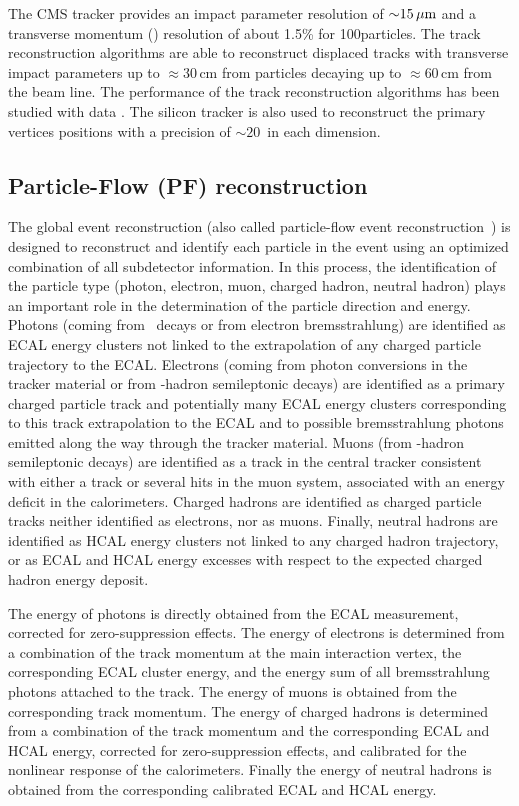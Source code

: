 The CMS tracker provides an impact parameter resolution of ${\sim}15\,\mu\text{m}$ and a transverse momentum (\pt) resolution of about 1.5\% for 100\GeV particles. 
The track reconstruction algorithms are able to reconstruct displaced tracks with transverse impact
parameters up to ${\approx}30$\,cm from particles decaying up to ${\approx}60$\,cm from the beam line.  The
performance of the track reconstruction algorithms has been studied with data
\cite{Khachatryan:2010pw}. 
The silicon
tracker is also used to reconstruct the primary vertices positions with a
precision of ${\sim}20$~\mum in each dimension.

\subsection{Particle-Flow (PF) reconstruction}

The global event reconstruction (also called particle-flow event reconstruction~\cite{CMS-PAS-PFT-09-001,CMS-PAS-PFT-10-001}) is designed to reconstruct and identify each particle in the event using an optimized combination of all subdetector information. 
In this process, the identification of the particle type (photon, electron, muon, charged hadron, neutral hadron) plays an important role in the determination of the particle direction and energy. Photons (\eg coming from \Pgpz\ decays or from electron bremsstrahlung) are identified as ECAL energy clusters not linked to the extrapolation of any charged particle trajectory to the ECAL. Electrons (\eg coming from photon conversions in the tracker material or from \cPqb-hadron semileptonic decays) are identified as a primary charged particle track and potentially many ECAL energy clusters corresponding to this track extrapolation to the ECAL and to possible bremsstrahlung photons emitted along the way through the tracker material. Muons (\eg from \cPqb-hadron semileptonic decays) are identified as a track in the central tracker consistent with either a track or several hits in the muon system, associated with an energy deficit in the calorimeters. Charged hadrons are identified as charged particle tracks neither identified as electrons, nor as muons. Finally, neutral hadrons are identified as HCAL energy clusters not linked to any charged hadron trajectory, or as ECAL and HCAL energy excesses with respect to the expected charged hadron energy deposit. 

The energy of photons is directly obtained from the ECAL measurement, corrected for zero-suppression effects. The energy of electrons is determined from a combination of the track momentum at the main interaction vertex, the corresponding ECAL cluster energy, and the energy sum of all bremsstrahlung photons attached to the track. The energy of muons is obtained from the corresponding track momentum. The energy of charged hadrons is determined from a combination of the track momentum and the corresponding ECAL and HCAL energy, corrected for zero-suppression effects, and calibrated for the nonlinear response of the calorimeters. Finally the energy of neutral hadrons is obtained from the corresponding calibrated ECAL and HCAL energy. 

